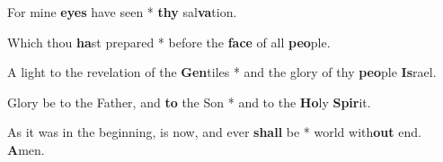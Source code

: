 \begin{multicols}{2}
	For mine \textbf{eyes} have seen * \textbf{thy} sal\textbf{va}tion.
	
	Which thou \textbf{ha}st prepared * before the \textbf{face} of all \textbf{peo}ple.
	
	A light to the revelation of the \textbf{Gen}tiles * and the glory of thy \textbf{peo}ple \textbf{Is}rael.
	
	Glory be to the Father, and \textbf{to} the Son * and to the \textbf{Ho}ly \textbf{Spir}it.
	
	As it was in the beginning, is now, and ever \textbf{shall} be * world with\textbf{out} end. \textbf{A}men.
\end{multicols}